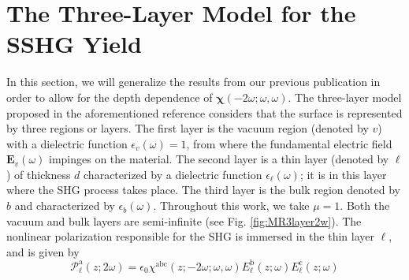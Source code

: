 \documentclass[utf8]{frontiersSCNS}
\begin{document}


\section{The Three-Layer Model for the SSHG Yield}\label{sec:threelayer}

In this section, we will generalize the results from our previous publication
\citep{andersonPRB16b} in order to allow for the depth dependence of
$\boldsymbol{\chi}(-2\omega;\omega,\omega)$. The three-layer model proposed in
the aforementioned reference considers that the surface is represented by three
regions or layers. The first layer is the vacuum region (denoted by $v$) with a
dielectric function $\epsilon_{v}(\omega) = 1$, from where the fundamental
electric field $\mathbf{E}_{v}(\omega)$ impinges on the material. The second
layer is a thin layer (denoted by $\ell$) of thickness $d$ characterized by a
dielectric function $\epsilon_{\ell}(\omega)$; it is in this layer where the SHG
process takes place. The third layer is the bulk region denoted by $b$ and
characterized by $\epsilon_{b}(\omega)$. 
{\color{red}
Throughout this work, we take $\mu = 1$. 
}
Both the vacuum and bulk layers are semi-infinite (see Fig.
\ref{fig:MR3layer2w}). The nonlinear polarization responsible for the SHG is
immersed in the thin layer $\ell$, and is given by
\begin{equation}\label{eq:tres}
\mathcal{P}^{\mathrm{a}}_{\ell}(z;2\omega)=
\epsilon_{0}\chi^{\mathrm{abc}}(z;-2\omega;\omega,\omega)
    E^{\mathrm{b}}_{\ell}(z;\omega)E^{\mathrm{c}}_{\ell}(z;\omega)
\end{equation}
\end{document}
